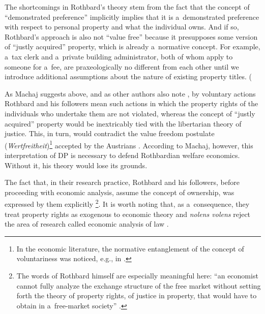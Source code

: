 The shortcomings in Rothbard's theory stem from the fact that the concept of ``demonstrated preference'' implicitly implies that it is a~demonstrated preference with respect to personal property and what the individual owns. And if so, Rothbard's approach is also not ``value free'' because it presupposes some version of ``justly acquired'' property, which is already a~normative concept. For example, a~tax clerk and a~private building administrator, both of whom apply to someone for a~fee, are praxeologically no different from each other until we introduce additional assumptions about the nature of existing property titles. (
\parencite[][own transl.]{machaj_murray_2014}%




As Machaj suggests above, and as other authors also note 
\parencite[e.g.,][]{cordato_welfare_1992}, %
 by voluntary actions Rothbard and his followers mean such actions in which the property rights of the individuals who undertake them are not violated, whereas the concept of ``justly acquired'' property would be inextricably tied with the libertarian theory of justice. This, in turn, would contradict the value freedom postulate (\textit{Wertfreitheit})\footnote{In the economic literature, the normative entanglement of the concept of voluntariness was noticed, e.g., in 
\parencites[][]{high_is_1985}[][]{hausman_economic_2006}.%
} accepted by the Austrians 
\parencites[e.g.,][]{mises_human_1998}[][]{rothbard_praxeology_2011}[][]{kirzner_value-freedom_1994}[][]{block_value_2005}. %
 According to Machaj, however, this interpretation of DP is necessary to defend Rothbardian welfare economics. Without it, his theory would lose its grounds.



The fact that, in their research practice, Rothbard and his followers, before proceeding with economic analysis, assume the concept of ownership, was expressed by them explicitly \footnote{The words of Rothbard himself are especially meaningful here: ``an economist cannot fully analyze the exchange structure of the free market without setting forth the theory of property rights, of justice in property, that would have to obtain in a~free-market society'' 
\parencites[][]{block_ethics_1995}[][]{block_private-property_2000}[][]{hulsmann_priori_2004}[][p.1047]{rothbard_power_2009}[][]{rothbard_man_2009}.%
}. It is worth noting that, as a~consequence, they treat property rights as exogenous to economic theory and \textit{nolens volens} reject the area of research called economic analysis of law 
\parencite[see:][]{machaj_murray_2014}.%




